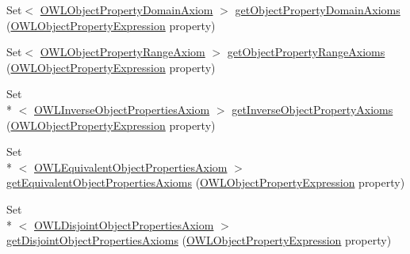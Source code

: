 \begin{DoxyCompactItemize}
\item 
Set$<$ \hyperlink{interfaceorg_1_1semanticweb_1_1owlapi_1_1model_1_1_o_w_l_object_property_domain_axiom}{O\-W\-L\-Object\-Property\-Domain\-Axiom} $>$ \hyperlink{classuk_1_1ac_1_1manchester_1_1cs_1_1owl_1_1owlapi_1_1_o_w_l_ontology_impl_a606e70343d53149717b15d25eeeae4d5}{get\-Object\-Property\-Domain\-Axioms} (\hyperlink{interfaceorg_1_1semanticweb_1_1owlapi_1_1model_1_1_o_w_l_object_property_expression}{O\-W\-L\-Object\-Property\-Expression} property)
\item 
Set$<$ \hyperlink{interfaceorg_1_1semanticweb_1_1owlapi_1_1model_1_1_o_w_l_object_property_range_axiom}{O\-W\-L\-Object\-Property\-Range\-Axiom} $>$ \hyperlink{classuk_1_1ac_1_1manchester_1_1cs_1_1owl_1_1owlapi_1_1_o_w_l_ontology_impl_a98cbf4c5bbbb1767d091ff6c695f88c5}{get\-Object\-Property\-Range\-Axioms} (\hyperlink{interfaceorg_1_1semanticweb_1_1owlapi_1_1model_1_1_o_w_l_object_property_expression}{O\-W\-L\-Object\-Property\-Expression} property)
\item 
Set\\*
$<$ \hyperlink{interfaceorg_1_1semanticweb_1_1owlapi_1_1model_1_1_o_w_l_inverse_object_properties_axiom}{O\-W\-L\-Inverse\-Object\-Properties\-Axiom} $>$ \hyperlink{classuk_1_1ac_1_1manchester_1_1cs_1_1owl_1_1owlapi_1_1_o_w_l_ontology_impl_a42c64be14a007ea59d8ace3da2a54019}{get\-Inverse\-Object\-Property\-Axioms} (\hyperlink{interfaceorg_1_1semanticweb_1_1owlapi_1_1model_1_1_o_w_l_object_property_expression}{O\-W\-L\-Object\-Property\-Expression} property)
\item 
Set\\*
$<$ \hyperlink{interfaceorg_1_1semanticweb_1_1owlapi_1_1model_1_1_o_w_l_equivalent_object_properties_axiom}{O\-W\-L\-Equivalent\-Object\-Properties\-Axiom} $>$ \hyperlink{classuk_1_1ac_1_1manchester_1_1cs_1_1owl_1_1owlapi_1_1_o_w_l_ontology_impl_aa790ae13a0b286f62f83c81ea92fa91f}{get\-Equivalent\-Object\-Properties\-Axioms} (\hyperlink{interfaceorg_1_1semanticweb_1_1owlapi_1_1model_1_1_o_w_l_object_property_expression}{O\-W\-L\-Object\-Property\-Expression} property)
\item 
Set\\*
$<$ \hyperlink{interfaceorg_1_1semanticweb_1_1owlapi_1_1model_1_1_o_w_l_disjoint_object_properties_axiom}{O\-W\-L\-Disjoint\-Object\-Properties\-Axiom} $>$ \hyperlink{classuk_1_1ac_1_1manchester_1_1cs_1_1owl_1_1owlapi_1_1_o_w_l_ontology_impl_a4d9b4da80bcf8c45dc6c38ee6e7540f3}{get\-Disjoint\-Object\-Properties\-Axioms} (\hyperlink{interfaceorg_1_1semanticweb_1_1owlapi_1_1model_1_1_o_w_l_object_property_expression}{O\-W\-L\-Object\-Property\-Expression} property)

\end{DoxyCompactItemize}
